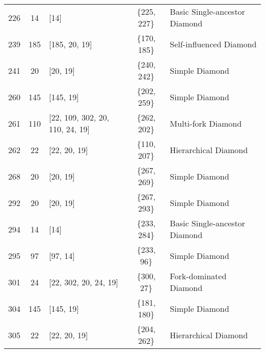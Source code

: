 \begin{table*}[!ht]
{\begin{tabular}{cclcl}
\hline
226 & 14 & [14] & \{225, 227\} & Basic Single-ancestor Diamond \\
239 & 185 & [185, 20, 19] & \{170, 185\} & Self-influenced Diamond \\
241 & 20 & [20, 19] & \{240, 242\} & Simple Diamond \\
260 & 145 & [145, 19] & \{202, 259\} & Simple Diamond \\
261 & 110 & [22, 109, 302, 20, 110, 24, 19] & \{262, 202\} & Multi-fork Diamond \\
\hline
262 & 22 & [22, 20, 19] & \{110, 207\} & Hierarchical Diamond \\
268 & 20 & [20, 19] & \{267, 269\} & Simple Diamond \\
292 & 20 & [20, 19] & \{267, 293\} & Simple Diamond \\
294 & 14 & [14] & \{233, 284\} & Basic Single-ancestor Diamond \\
295 & 97 & [97, 14] & \{233, 96\} & Simple Diamond \\
\hline
301 & 24 & [22, 302, 20, 24, 19] & \{300, 27\} & Fork-dominated Diamond \\
304 & 145 & [145, 19] & \{181, 180\} & Simple Diamond \\
305 & 22 & [22, 20, 19] & \{204, 262\} & Hierarchical Diamond \\
\hline
\end{tabular}%
}
\end{table*}
